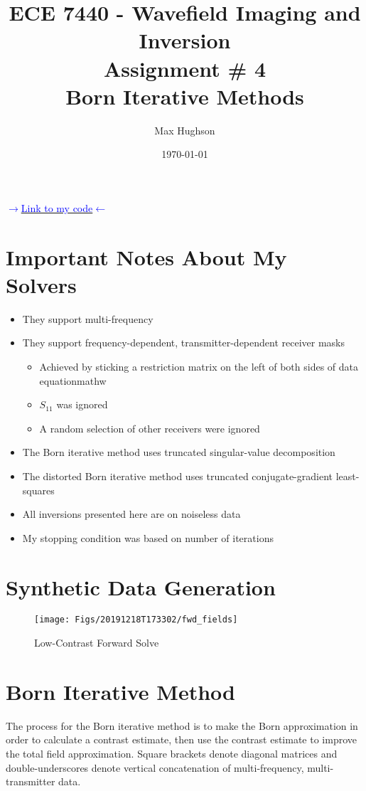 \documentclass[final,titlepage,onecolumn]{article}
\title{ECE 7440 - Wavefield Imaging and Inversion\\
Assignment \# 4\\
Born Iterative Methods}
\author{Max Hughson}
\date{\today}
\begin{document}
\maketitle

\begin{center}
\Large{\href{https://github.com/hughsonm/WFI/tree/master/Assignments/A4}{\textcolor{blue}{$ \rightarrow $Link to my code$ \leftarrow $}}}	
\end{center}

\normalsize

\FloatBarrier
\section{Important Notes About My Solvers}
\begin{itemize}
	\item They support multi-frequency
	\item They support frequency-dependent, transmitter-dependent receiver masks
	\begin{itemize}
		\item Achieved by sticking a restriction matrix on the left of both sides of data equationmathw
		\item $ S_{11} $ was ignored
		\item A random selection of other receivers were ignored
	\end{itemize}
	\item The Born iterative method uses truncated singular-value decomposition
	\item The distorted Born iterative method uses truncated conjugate-gradient least-squares
	\item All inversions presented here are on noiseless data
	\item My stopping condition was based on number of iterations
\end{itemize}

\FloatBarrier
\section{Synthetic Data Generation}
\begin{figure}[h]
	\centering
	\texttt{[image: Figs/20191218T173302/fwd\_fields]}
	\caption[fwd_fields]{Low-Contrast Forward Solve}
	\label{fig:fwdfields}
\end{figure}



\FloatBarrier
\section{Born Iterative Method}
The process for the Born iterative method is to make the Born approximation in order to calculate a contrast estimate, then use the contrast estimate to improve the total field approximation. Square brackets denote diagonal matrices and double-underscores denote vertical concatenation of multi-frequency, multi-transmitter data.
\end{document}
